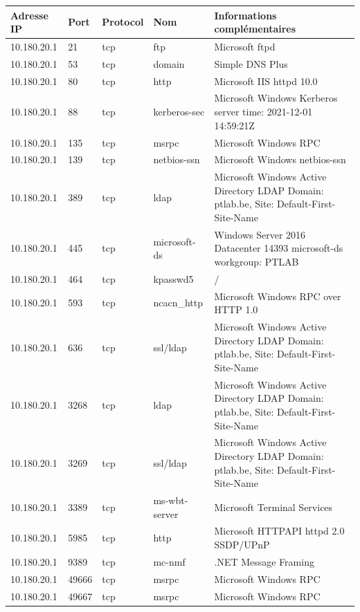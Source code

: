 \documentclass[french,paper=a4,oneside,captions=tableheading]{article}
\begin{document}
\begin{center} \begin{longtable}{llllp{8.5cm}}
    Adresse IP   & Port & Protocol & Nom & Informations complémentaires  \\ \hline
    10.180.20.1  & 21    & tcp & ftp          & Microsoft ftpd \\
    10.180.20.1  & 53    & tcp & domain       & Simple DNS Plus \\
    10.180.20.1  & 80    & tcp & http         & Microsoft IIS httpd 10.0 \\
    10.180.20.1  & 88    & tcp & kerberos-sec & Microsoft Windows Kerberos server time: 2021-12-01 14:59:21Z \\
    10.180.20.1  & 135   & tcp & msrpc        & Microsoft Windows RPC \\
    10.180.20.1  & 139   & tcp & netbios-ssn  & Microsoft Windows netbios-ssn \\
    10.180.20.1  & 389   & tcp & ldap         & Microsoft Windows Active Directory LDAP Domain: ptlab.be, Site: Default-First-Site-Name \\
    10.180.20.1  & 445   & tcp & microsoft-ds & Windows Server 2016 Datacenter 14393 microsoft-ds workgroup: PTLAB \\
    10.180.20.1  & 464   & tcp & kpasswd5     & / \\
    10.180.20.1  & 593   & tcp & ncacn\_http  & Microsoft Windows RPC over HTTP 1.0 \\
    10.180.20.1  & 636   & tcp & ssl/ldap     & Microsoft Windows Active Directory LDAP Domain: ptlab.be, Site: Default-First-Site-Name \\
    10.180.20.1  & 3268  & tcp & ldap         & Microsoft Windows Active Directory LDAP Domain: ptlab.be, Site: Default-First-Site-Name \\
    10.180.20.1  & 3269  & tcp & ssl/ldap     & Microsoft Windows Active Directory LDAP Domain: ptlab.be, Site: Default-First-Site-Name \\
    10.180.20.1  & 3389  & tcp & ms-wbt-server& Microsoft Terminal Services \\
    10.180.20.1  & 5985  & tcp & http         & Microsoft HTTPAPI httpd 2.0 SSDP/UPnP \\
    10.180.20.1  & 9389  & tcp & mc-nmf       & .NET Message Framing \\
    10.180.20.1  & 49666 & tcp & msrpc        & Microsoft Windows RPC \\
    10.180.20.1  & 49667 & tcp & msrpc        & Microsoft Windows RPC \\

\end{longtable}
\end{center}
\end{document}
